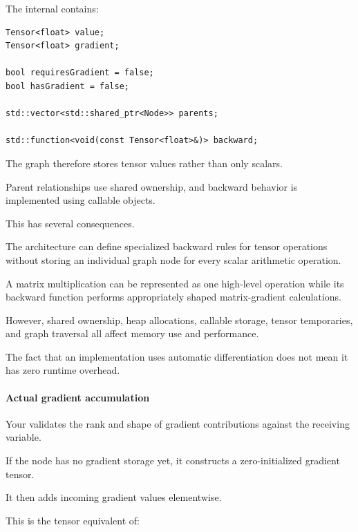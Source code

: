 \hypertarget{02-foundations-ii-ch022-graph-representation}{}

The internal  contains:

\begin{verbatim}
Tensor<float> value;
Tensor<float> gradient;

bool requiresGradient = false;
bool hasGradient = false;

std::vector<std::shared_ptr<Node>> parents;

std::function<void(const Tensor<float>&)> backward;
\end{verbatim}

The graph therefore stores tensor values rather than only scalars.

Parent relationships use shared ownership, and backward behavior is implemented using callable objects.

This has several consequences.

The architecture can define specialized backward rules for tensor operations without storing an individual graph node for every scalar arithmetic operation.

A matrix multiplication can be represented as one high-level operation while its backward function performs appropriately shaped matrix-gradient calculations.

However, shared ownership, heap allocations, callable storage, tensor temporaries, and graph traversal all affect memory use and performance.

The fact that an implementation uses automatic differentiation does not mean it has zero runtime overhead.

\paragraph{Actual gradient accumulation}\label{02-foundations-ii-ch022-actual-gradient-accumulation}

\hypertarget{02-foundations-ii-ch022-actual-gradient-accumulation}{}

Your  validates the rank and shape of gradient contributions against the receiving variable.

If the node has no gradient storage yet, it constructs a zero-initialized gradient tensor.

It then adds incoming gradient values elementwise.

This is the tensor equivalent of:

